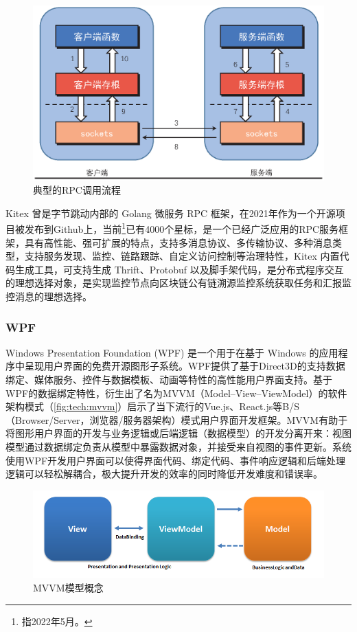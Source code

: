 \documentclass[supercite]{HustGraduPaper}
\newcommand{\xfig}[3]{
  \begin{figure}[htb]
    \centering
    #3
    \caption{#2}
    \label{fig:#1}
  \end{figure}
}
\newcommand{\rfig}[1]{\autoref{fig:#1}}
\theoremstyle{definition}
\begin{document}
\xfig{tech:rpc}{典型的RPC调用流程}{
  \includegraphics[width=\textwidth]{images/2.3-rpc.ps}
}

Kitex 曾是字节跳动内部的 Golang 微服务 RPC 框架，在2021年作为一个开源项目被发布到Github上，当前\footnote{指2022年5月。}已有4000个星标，是一个已经广泛应用的RPC服务框架，具有高性能、强可扩展的特点，支持多消息协议、多传输协议、多种消息类型，支持服务发现、监控、链路跟踪、自定义访问控制等治理特性，Kitex 内置代码生成工具，可支持生成 Thrift、Protobuf 以及脚手架代码，是分布式程序交互的理想选择对象，是实现监控节点向区块链公有链溯源监控系统获取任务和汇报监控消息的理想选择。
\subsubsection{WPF}

Windows Presentation Foundation (WPF) 是一个用于在基于 Windows 的应用程序中呈现用户界面的免费开源图形子系统。WPF提供了基于Direct3D的支持数据绑定、媒体服务、控件与数据模板、动画等特性的高性能用户界面支持。基于WPF的数据绑定特性，衍生出了名为MVVM（Model–View–ViewModel）的软件架构模式（\rfig{tech:mvvm}）启示了当下流行的Vue.js、React.js等B/S（Browser/Server，浏览器/服务器架构）模式用户界面开发框架。MVVM有助于将图形用户界面的开发与业务逻辑或后端逻辑（数据模型）的开发分离开来：视图模型通过数据绑定负责从模型中暴露数据对象，并接受来自视图的事件更新。系统使用WPF开发用户界面可以使得界面代码、绑定代码、事件响应逻辑和后端处理逻辑可以轻松解耦合，极大提升开发的效率的同时降低开发难度和错误率。

\xfig{tech:mvvm}{MVVM模型概念}{
  \includegraphics[width=\textwidth]{images/2.3-mvvm.png}
}
\end{document}
